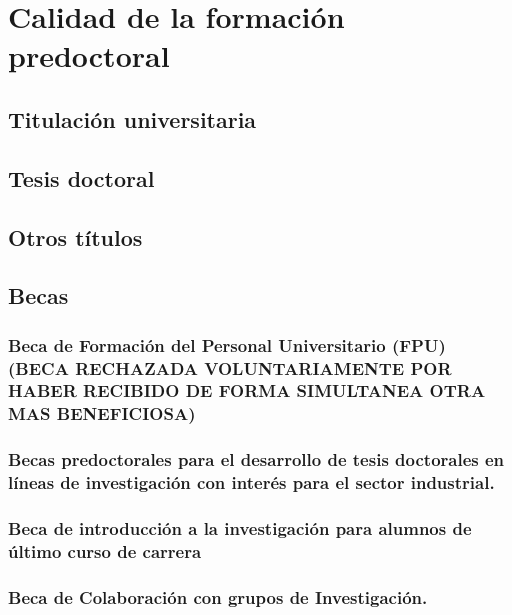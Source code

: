 \documentclass[a4paper, 11pt, twoside, openright]{report}
\begin{document}
\section{Calidad de la formación predoctoral}

\subsection{Titulación universitaria}



\subsection{Tesis doctoral}



\subsection{Otros títulos}

\subsection{Becas}

\subsubsection{Beca de Formación del Personal Universitario (FPU) (BECA RECHAZADA VOLUNTARIAMENTE POR HABER RECIBIDO DE FORMA SIMULTANEA OTRA MAS BENEFICIOSA)}


\subsubsection{Becas predoctorales para el desarrollo de tesis doctorales en líneas de investigación con interés para el sector industrial.}


\subsubsection{Beca de introducción a la investigación para alumnos de último curso de carrera}


\subsubsection{Beca de Colaboración con grupos de Investigación.}

\end{document}
